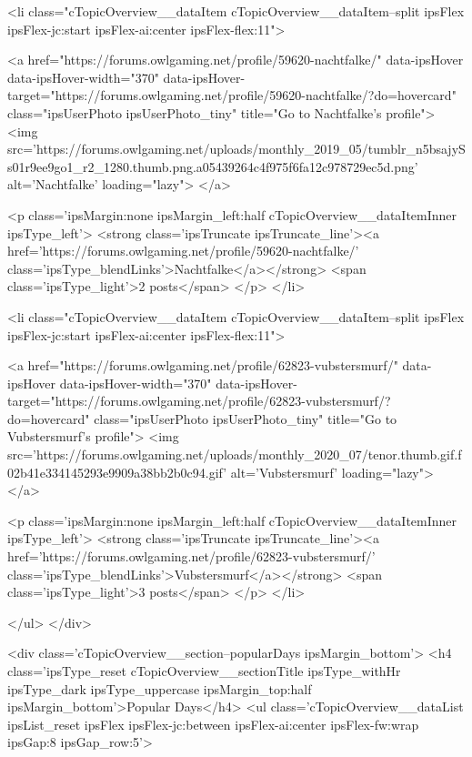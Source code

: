 						<li class="cTopicOverview__dataItem cTopicOverview__dataItem--split ipsFlex ipsFlex-jc:start ipsFlex-ai:center ipsFlex-flex:11">
							


	<a href="https://forums.owlgaming.net/profile/59620-nachtfalke/" data-ipsHover data-ipsHover-width="370" data-ipsHover-target="https://forums.owlgaming.net/profile/59620-nachtfalke/?do=hovercard" class="ipsUserPhoto ipsUserPhoto_tiny" title="Go to Nachtfalke's profile">
		<img src='https://forums.owlgaming.net/uploads/monthly_2019_05/tumblr_n5bsajySs01r9ee9go1_r2_1280.thumb.png.a05439264c4f975f6fa12c978729ec5d.png' alt='Nachtfalke' loading="lazy">
	</a>

							<p class='ipsMargin:none ipsMargin_left:half cTopicOverview__dataItemInner ipsType_left'>
								<strong class='ipsTruncate ipsTruncate_line'><a href='https://forums.owlgaming.net/profile/59620-nachtfalke/' class='ipsType_blendLinks'>Nachtfalke</a></strong>
								<span class='ipsType_light'>2 posts</span>
							</p>
						</li>
					
						<li class="cTopicOverview__dataItem cTopicOverview__dataItem--split ipsFlex ipsFlex-jc:start ipsFlex-ai:center ipsFlex-flex:11">
							


	<a href="https://forums.owlgaming.net/profile/62823-vubstersmurf/" data-ipsHover data-ipsHover-width="370" data-ipsHover-target="https://forums.owlgaming.net/profile/62823-vubstersmurf/?do=hovercard" class="ipsUserPhoto ipsUserPhoto_tiny" title="Go to Vubstersmurf's profile">
		<img src='https://forums.owlgaming.net/uploads/monthly_2020_07/tenor.thumb.gif.f02b41e334145293e9909a38bb2b0c94.gif' alt='Vubstersmurf' loading="lazy">
	</a>

							<p class='ipsMargin:none ipsMargin_left:half cTopicOverview__dataItemInner ipsType_left'>
								<strong class='ipsTruncate ipsTruncate_line'><a href='https://forums.owlgaming.net/profile/62823-vubstersmurf/' class='ipsType_blendLinks'>Vubstersmurf</a></strong>
								<span class='ipsType_light'>3 posts</span>
							</p>
						</li>
					
				</ul>
			</div>
		
		
			<div class='cTopicOverview__section--popularDays ipsMargin_bottom'>
				<h4 class='ipsType_reset cTopicOverview__sectionTitle ipsType_withHr ipsType_dark ipsType_uppercase ipsMargin_top:half ipsMargin_bottom'>Popular Days</h4>
				<ul class='cTopicOverview__dataList ipsList_reset ipsFlex ipsFlex-jc:between ipsFlex-ai:center ipsFlex-fw:wrap ipsGap:8 ipsGap_row:5'>
					
